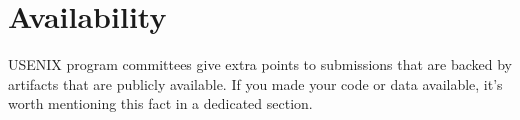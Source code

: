 \section*{Availability}

USENIX program committees give extra points to submissions that are
backed by artifacts that are publicly available. If you made your code
or data available, it's worth mentioning this fact in a dedicated
section.






